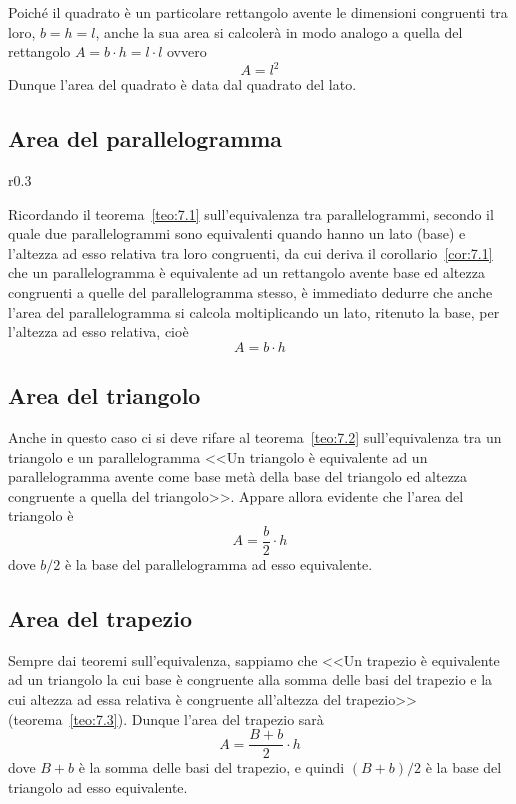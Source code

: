Poiché il quadrato è un particolare rettangolo avente le dimensioni 
congruenti tra loro, \(b = h = l\), anche la sua area si calcolerà in 
modo analogo a quella del rettangolo \(A=b\cdot h=l\cdot l\) ovvero
\[\boxed{A=l^2}\]
Dunque l'area del quadrato è data dal quadrato del lato.

\subsection{Area del parallelogramma}

\begin{wrapfigure}{r}{0.3\textwidth}
	\centering
\end{wrapfigure}
Ricordando il teorema~\ref{teo:7.1} sull'equivalenza tra 
parallelogrammi, secondo il quale due parallelogrammi sono 
equivalenti quando hanno un lato (base) e l'altezza ad esso relativa 
tra loro congruenti, da cui deriva il corollario~\ref{cor:7.1} che un 
parallelogramma è equivalente ad un rettangolo avente base ed altezza 
congruenti a quelle del parallelogramma stesso, è immediato dedurre 
che anche l'area del parallelogramma si calcola moltiplicando un 
lato, ritenuto la base, per l'altezza ad esso relativa, cioè
\[\boxed{A=b\cdot h}\]

\subsection{Area del triangolo}

Anche in questo caso ci si deve rifare al teorema~\ref{teo:7.2} 
sull'equivalenza tra un triangolo e un parallelogramma <<Un triangolo 
è equivalente ad un parallelogramma avente come base metà della base 
del triangolo ed altezza congruente a quella del triangolo>>. Appare 
allora evidente che l'area del triangolo è
\[\boxed{A=\dfrac{b}{2}\cdot h}\]
dove \(b/2\) è la base del parallelogramma ad esso equivalente.

\subsection{Area del trapezio}

Sempre dai teoremi sull'equivalenza, sappiamo che <<Un trapezio è 
equivalente ad un triangolo la cui base è congruente alla somma delle 
basi del trapezio e la cui altezza ad essa relativa è congruente 
all'altezza del trapezio>> (teorema~\ref{teo:7.3}). Dunque l'area del 
trapezio sarà
\[\boxed{A=\dfrac{B+b}{2}\cdot h}\]
dove \(B + b\) è la somma delle basi del trapezio, e quindi \((B + b)/2\) 
è la base del triangolo ad esso equivalente.

